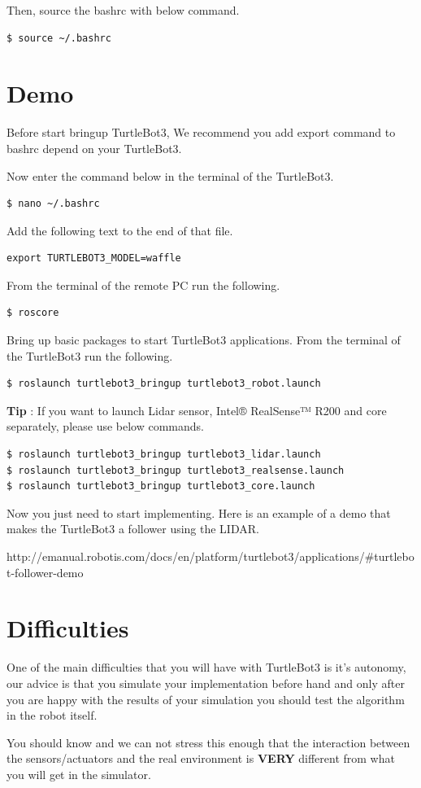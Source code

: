 \documentclass{article}
\begin{document}
Then, source the bashrc with below command.

\begin{verbatim}
$ source ~/.bashrc
\end{verbatim}

 \newpage
 
 \section{Demo}
 
Before start bringup TurtleBot3, We recommend you add export command to bashrc depend on your TurtleBot3.
 
Now enter the command below in the terminal of the TurtleBot3.

\begin{verbatim}
$ nano ~/.bashrc
\end{verbatim}

Add the following text to the end of that file.

\begin{verbatim}
export TURTLEBOT3_MODEL=waffle
\end{verbatim}

From the terminal of the remote PC run the following.

\begin{verbatim}
$ roscore
\end{verbatim}

Bring up basic packages to start TurtleBot3 applications. From the terminal of the TurtleBot3 run the following.

\begin{verbatim}
$ roslaunch turtlebot3_bringup turtlebot3_robot.launch
\end{verbatim}

\textbf{Tip} : If you want to launch Lidar sensor, Intel® RealSense™ R200 and core separately, please use below commands.

\begin{verbatim}
$ roslaunch turtlebot3_bringup turtlebot3_lidar.launch
$ roslaunch turtlebot3_bringup turtlebot3_realsense.launch
$ roslaunch turtlebot3_bringup turtlebot3_core.launch
\end{verbatim}

Now you just need to start implementing. Here is an example of a demo that makes the TurtleBot3 a follower using the LIDAR.

http://emanual.robotis.com/docs/en/platform/turtlebot3/applications/\#turtlebot-follower-demo
 
 \newpage
 
\section{Difficulties}
 
One of the main difficulties that you will have with TurtleBot3 is it's autonomy, our advice is that you simulate your implementation before hand and only after you are happy with the results of your simulation you should test the algorithm in the robot itself.

You should know and we can not stress this enough that the interaction between the sensors/actuators and the real environment is \textbf{VERY} different from what you will get in the simulator.
\end{document}
